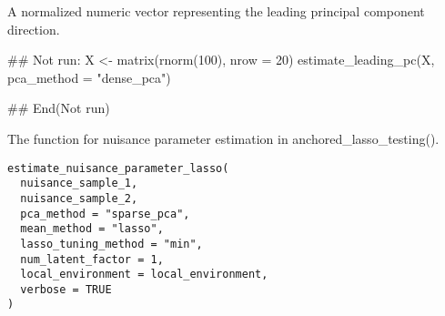 \documentclass[a4paper]{book}
\begin{document}
%
\begin{Value}
A normalized numeric vector representing the leading principal component direction.
\end{Value}
%
\begin{Examples}
\begin{ExampleCode}
## Not run: 
X <- matrix(rnorm(100), nrow = 20)
estimate_leading_pc(X, pca_method = "dense_pca")

## End(Not run)

\end{ExampleCode}
\end{Examples}
%
\begin{Description}
The function for nuisance parameter estimation in anchored\_lasso\_testing().
\end{Description}
%
\begin{Usage}
\begin{verbatim}
estimate_nuisance_parameter_lasso(
  nuisance_sample_1,
  nuisance_sample_2,
  pca_method = "sparse_pca",
  mean_method = "lasso",
  lasso_tuning_method = "min",
  num_latent_factor = 1,
  local_environment = local_environment,
  verbose = TRUE
)
\end{verbatim}
\end{Usage}
%
\end{document}
